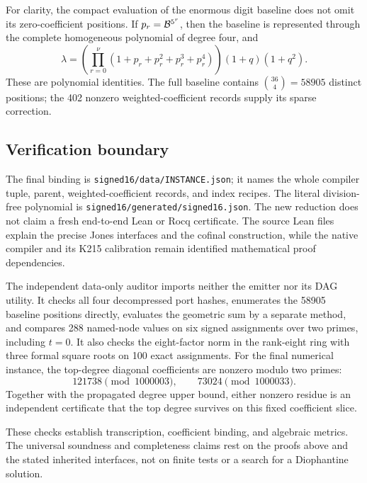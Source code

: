 For clarity, the compact evaluation of the enormous digit baseline
does not omit its zero-coefficient positions.  If
\(p_r={\cal B}^{5^r}\), then the baseline is represented through the
complete homogeneous polynomial of degree four, and
\[
 \lambda
 =\left(\prod_{r=0}^{\nu}
       (1+p_r+p_r^2+p_r^3+p_r^4)\right)(1+q)(1+q^2).
\]
These are polynomial identities.
The full baseline contains
\(\binom{36}{4}=58905\) distinct positions; the 402 nonzero
weighted-coefficient records supply its sparse correction.

\subsection{Verification boundary}

The final binding is
\texttt{signed16/data/INSTANCE.json}; it names the whole compiler
tuple, parent, weighted-coefficient records, and index recipes.
The literal division-free polynomial is
\texttt{signed16/generated/signed16.json}.
The new reduction does not claim a fresh end-to-end Lean or Rocq
certificate.  The source Lean files explain the precise Jones interfaces
and the cofinal construction, while the native compiler and its K215
calibration remain identified mathematical proof dependencies.

The independent data-only auditor imports neither the emitter nor its DAG
utility.  It checks all four decompressed port hashes, enumerates the
58905 baseline positions directly, evaluates the geometric sum by a
separate method, and compares 288 named-node values on six signed
assignments over two primes, including \(t=0\).
It also checks the eight-factor norm in the rank-eight ring with three
formal square roots on 100 exact assignments.
For the final numerical instance, the top-degree diagonal coefficients
are nonzero modulo two primes:
\[
 121738\pmod{1000003},\qquad
 73024\pmod{1000033}.
\]
Together with the propagated degree upper bound, either nonzero residue
is an independent certificate that the top degree survives on this fixed
coefficient slice.

These checks establish transcription, coefficient binding, and algebraic
metrics.  The universal soundness and completeness claims rest on the
proofs above and the stated inherited interfaces, not on finite tests or
a search for a Diophantine solution.

